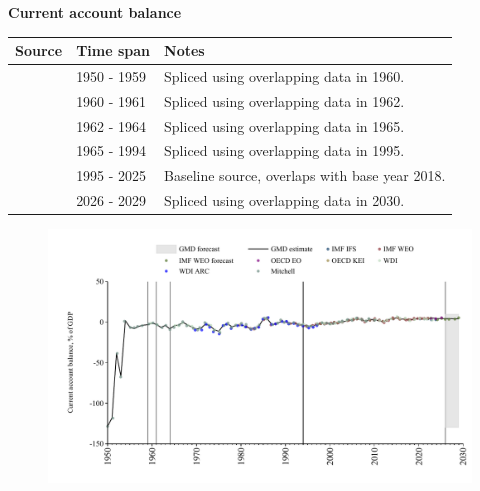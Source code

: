 \documentclass[12pt,a4paper,landscape]{article}
\begin{document}
\begin{adjustbox}{max totalsize={\paperwidth}{\paperheight},center}
\begin{minipage}[t][\textheight][t]{\textwidth}
\vspace*{0.5cm}
{}
\begin{center}
{\Large\bfseries Current account balance}
\end{center}
\vspace{0.5cm}
\begin{table}[H]
\centering
\small
\begin{tabular}{|l|l|l|}
\hline
\textbf{Source} & \textbf{Time span} & \textbf{Notes} \\
\hline
\rowcolor{white}\cite{Mitchell}& 1950 - 1959 &Spliced using overlapping data in 1960. \\
\rowcolor{lightgray}\cite{WDI}& 1960 - 1961 &Spliced using overlapping data in 1962. \\
\rowcolor{white}\cite{Mitchell}& 1962 - 1964 &Spliced using overlapping data in 1965. \\
\rowcolor{lightgray}\cite{WDI}& 1965 - 1994 &Spliced using overlapping data in 1995. \\
\rowcolor{white}\cite{OECD_EO}& 1995 - 2025 &Baseline source, overlaps with base year 2018. \\
\rowcolor{lightgray}\cite{IMF_WEO_forecast}& 2026 - 2029 &Spliced using overlapping data in 2030. \\
\hline
\end{tabular}
\end{table}
\begin{figure}[H]
\centering
\includegraphics[width=\textwidth,height=0.6\textheight,keepaspectratio]{graphs/ISR_CA_GDP.pdf}
\end{figure}
\end{minipage}
\end{adjustbox}
\end{document}
